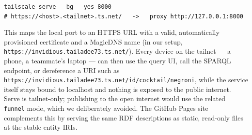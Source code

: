 \begin{verbatim}
tailscale serve --bg --yes 8000
# https://<host>.<tailnet>.ts.net/   ->   proxy http://127.0.0.1:8000
\end{verbatim}

This maps the local port to an HTTPS URL with a valid, automatically provisioned
certificate and a MagicDNS name (in our setup,
\texttt{https://invidious.tailadee73.ts.net/}). Every device on the tailnet --- a
phone, a teammate's laptop --- can then use the query UI, call the SPARQL
endpoint, or dereference a URI such as
\texttt{https://invidious.tailadee73.ts.net/id/cocktail/negroni}, while the
service itself stays bound to localhost and nothing is exposed to the public
internet. Serve is tailnet-only; publishing to the open internet would use the
related \texttt{funnel} mode, which we deliberately avoided. The GitHub Pages
site complements this by serving the same RDF descriptions as static, read-only
files at the stable entity IRIs.
